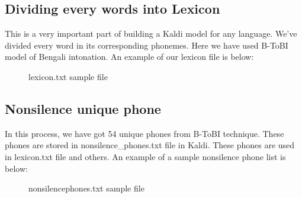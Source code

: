 \documentclass{standalone}
\begin{document}
    \subsection{Dividing every words into Lexicon}
     This is a very important part of building a Kaldi model for any language. We've divided every word in its corresponding phonemes. Here we have used B-ToBI model of Bengali intonation. An example of our lexicon file is below:
\\  
         \begin{figure}[h]
 \centering
{}
 \caption{lexicon.txt sample file}
\label{fig:lexicon}
\end{figure}

       \subsection{Nonsilence unique phone}
    In this process, we have got 54 unique phones from B-ToBI technique. These phones are stored in nonsilence\_phones.txt file in Kaldi. These phones are used in lexicon.txt file and others. An example of a sample nonsilence phone list is below:
\\
   \begin{figure}[h]
 \centering
 \caption{nonsilencephones.txt sample file}
\label{fig:nonsilence_phones}
\end{figure}
\end{document}
